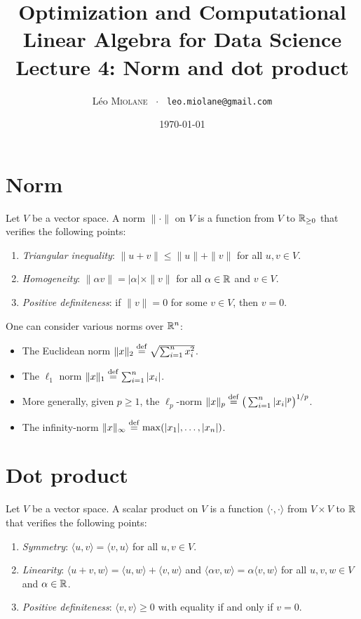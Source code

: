\documentclass[11pt,nocut]{article}
\title{\vspace{-2.0cm}%
	Optimization and Computational Linear Algebra for Data Science\\
Lecture 4: Norm and dot product}
\author{Léo \textsc{Miolane} \ $\cdot$ \ \texttt{leo.miolane@gmail.com}}
\date{\today}
\begin{document}
\maketitle


\section{Norm}

\begin{definition}[Norm]
	Let $V$ be a vector space.
	A norm $\| \cdot \|$ on $V$ is a function from $V$ to $\mathbb{R}_{\geq 0}$ that verifies the following points:
	\begin{enumerate}[label=(\roman*)]
		\item \emph{Triangular inequality}: $\|u + v\| \leq \|u\| + \|v\|$ for all $u,v \in V$.
		\item \emph{Homogeneity}: $\| \alpha v \| = |\alpha|\times \| v\|$ for all $\alpha \in \mathbb{R}$ and  $v \in V$.
		\item \emph{Positive definiteness}: if $\|v\| = 0$ for some $v \in V$, then $v=0$.
	\end{enumerate}
\end{definition}

\begin{example}
	One can consider various norms over $\mathbb{R}^n$:
	\begin{itemize}
		\item The Euclidean norm $\|x\|_2 \overset{\rm def}{=} \sqrt{\sum_{i=1}^n x_i^2}$.
		\item The $\ell_1$ norm $\|x\|_1 \overset{\rm def}{=} \sum_{i=1}^n |x_i|$.
		\item More generally, given $p \geq 1$, the $\ell_p$-norm $\|x\|_p \overset{\rm def}{=} \big(\sum_{i=1}^n |x_i|^p \big)^{1/p}$.
		\item The infinity-norm $\|x \|_{\infty} \overset{\rm def}{=} \max(|x_1|, \dots, |x_n|)$.
	\end{itemize}
\end{example}


\section{Dot product}

\begin{definition}
	Let $V$ be a vector space.
	A scalar product on $V$ is a function $\langle \cdot, \cdot \rangle$ from $V \times V$ to $\mathbb{R}$ that verifies the following points:
	\begin{enumerate}[label=(\roman*)]
		\item \emph{Symmetry}: $\langle u, v \rangle = \langle v, u\rangle$ for all $u,v \in V$.
		\item \emph{Linearity}: $\langle u+v, w \rangle = \langle u, w\rangle + \langle v, w\rangle$ and $\langle \alpha v, w \rangle = \alpha \langle v, w \rangle$ for all $u,v,w \in V$ and $\alpha \in \mathbb{R}$.
		\item \emph{Positive definiteness}: $\langle v, v\rangle \geq 0$ with equality if and only if $v = 0$.
	\end{enumerate}
\end{definition}
\end{document}
